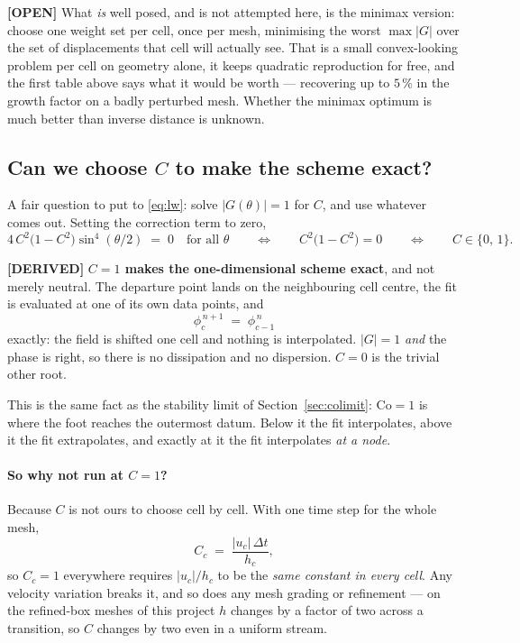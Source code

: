 \documentclass[11pt,a4paper]{article}
\newcommand{\derived}{\textcolor{blue!50!black}{\textbf{[DERIVED]}}}
\newcommand{\opn}{\textcolor{orange!80!black}{\textbf{[OPEN]}}}
\begin{document}
\opn{} What \emph{is} well posed, and is not attempted here, is the minimax version: choose one
weight set per cell, once per mesh, minimising the worst \(\max|G|\) over the set of
displacements that cell will actually see. That is a small convex-looking problem per cell on
geometry alone, it keeps quadratic reproduction for free, and the first table above says what it
would be worth --- recovering up to \(5\,\%\) in the growth factor on a badly perturbed mesh.
Whether the minimax optimum is much better than inverse distance is unknown.

\subsection{Can we choose \texorpdfstring{$C$}{C} to make the scheme exact?}
\label{sec:cexact}

A fair question to put to \eqref{eq:lw}: solve $|G(\theta)| = 1$ for $C$, and use whatever
comes out. Setting the correction term to zero,
\begin{equation}
  4\,C^{2}\bigl(1-C^{2}\bigr)\sin^{4}(\theta/2) \;=\; 0 \quad\text{for all }\theta
  \qquad\Longleftrightarrow\qquad C^{2}\bigl(1-C^{2}\bigr) = 0
  \qquad\Longleftrightarrow\qquad C \in \{0,\,1\}.
\end{equation}

\derived{} \textbf{$C = 1$ makes the one-dimensional scheme exact}, and not merely neutral. The
departure point lands on the neighbouring cell centre, the fit is evaluated at one of its own
data points, and
\begin{equation}
  \phi^{\,n+1}_{c} \;=\; \phi^{\,n}_{c-1}
\end{equation}
exactly: the field is shifted one cell and nothing is interpolated. $|G| = 1$ \emph{and} the
phase is right, so there is no dissipation and no dispersion. $C = 0$ is the trivial other root.

This is the same fact as the stability limit of Section~\ref{sec:colimit}: $\mathrm{Co} = 1$ is
where the foot reaches the outermost datum. Below it the fit interpolates, above it the fit
extrapolates, and exactly at it the fit interpolates \emph{at a node}.

\paragraph{So why not run at $C = 1$?} Because $C$ is not ours to choose cell by cell. With one
time step for the whole mesh,
\begin{equation}
  C_c \;=\; \frac{|u_c|\,\Delta t}{h_c},
\end{equation}
so $C_c = 1$ everywhere requires $|u_c|/h_c$ to be the \emph{same constant in every cell}. Any
velocity variation breaks it, and so does any mesh grading or refinement --- on the refined-box
meshes of this project $h$ changes by a factor of two across a transition, so $C$ changes by two
even in a uniform stream.
\end{document}
